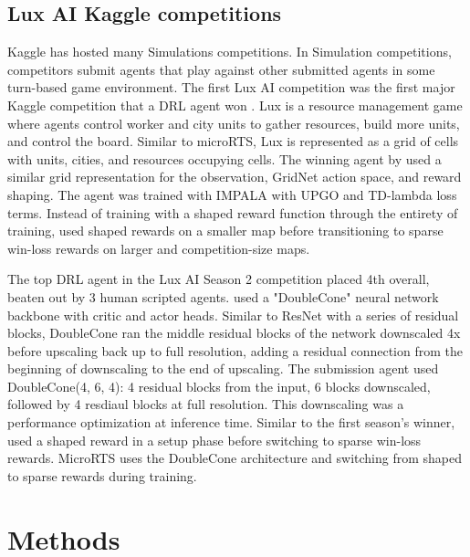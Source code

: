 \documentclass{article}
\begin{document}
\subsection{Lux AI Kaggle competitions}
Kaggle has hosted many Simulations competitions. In Simulation competitions, competitors
submit agents that play against other submitted agents in some turn-based game
environment. The first Lux AI competition was the first major Kaggle competition that a
DRL agent won \citep{lux-ai-2021}. Lux is a resource management game where agents
control worker and city units to gather resources, build more units, and control the
board. Similar to microRTS, Lux is represented as a grid of cells with units, cities,
and resources occupying cells. The winning agent by \citet{lux-ai-2021-winner} used a
similar grid representation for the observation, GridNet action space, and reward
shaping. The agent was trained with IMPALA with UPGO and TD-lambda loss terms. Instead
of training with a shaped reward function through the entirety of training, \citet{lux-ai-2021-winner}
used shaped rewards on a smaller map before transitioning to sparse win-loss rewards on
larger and competition-size maps.

The top DRL agent in the Lux AI Season 2 competition placed 4th overall, beaten out by 3
human scripted agents. \citet{Ferdinand2021doublecone} used a "DoubleCone" neural
network backbone with critic and actor heads. Similar to ResNet with a series of
residual blocks, DoubleCone ran the middle residual blocks of the network downscaled 4x
before upscaling back up to full resolution, adding a residual connection from the
beginning of downscaling to the end of upscaling. The submission agent used
DoubleCone(4, 6, 4): 4 residual blocks from the input, 6 blocks downscaled, followed by
4 resdiaul blocks at full resolution. This downscaling was a performance optimization at
inference time. Similar to the first season's winner, \citet{Ferdinand2021doublecone}
used a shaped reward in a setup phase before switching to sparse win-loss rewards. MicroRTS uses the DoubleCone architecture and switching from shaped to sparse rewards
during training.

\section{Methods}




\end{document}
